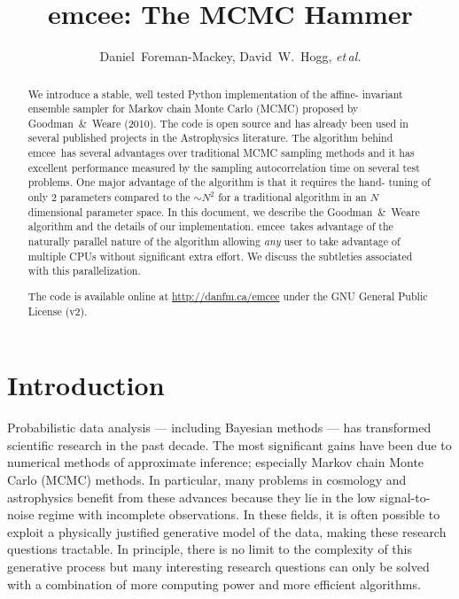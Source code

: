 \documentclass[12pt,preprint]{aastex}
\newcommand{\project}[1]{{\sffamily #1}}
\newcommand{\thisplain}{emcee}
\newcommand{\this}{\project{\thisplain}}
\newcommand{\paper}{document}
\newcommand{\license}{GNU General Public License (v2)}
\newcommand{\foreign}[1]{\emph{#1}}
\newcommand{\etal}{\foreign{et\,al.}}
\begin{document}
\title{\this: The MCMC Hammer}
\author{Daniel~Foreman-Mackey, David~W.~Hogg, \etal}

\begin{abstract}

    We introduce a stable, well tested Python implementation of the affine-%
    invariant ensemble sampler for Markov chain Monte Carlo (MCMC)
    proposed by Goodman~\&~Weare (2010). The code is open source and has
    already been used in several published projects in the Astrophysics
    literature. The algorithm behind \this~has several advantages over
    traditional MCMC sampling methods and it has excellent performance
    measured by the sampling autocorrelation time on several test problems.
    One major advantage of the algorithm is that it requires the hand-%
    tuning of only 2 parameters compared to the $\sim N^2$ for
    a traditional algorithm in an $N$ dimensional parameter space. In this
    \paper, we describe the Goodman~\&~Weare algorithm and the details of our
    implementation. \this~takes advantage of the naturally parallel nature of
    the algorithm allowing \emph{any} user to take advantage of multiple CPUs
    without significant extra effort. We discuss the subtleties associated
    with this parallelization.

    The code is available online at \url{http://danfm.ca/\thisplain} under the
    \license.

\end{abstract}


\section{Introduction}

Probabilistic data analysis --- including Bayesian methods --- has
transformed scientific research in the past decade. The most significant
gains have been due to numerical methods of approximate inference;
especially Markov chain Monte Carlo (MCMC) methods. In particular, many
problems in cosmology and astrophysics benefit from these advances because
they lie in the low signal-to-noise regime with incomplete
observations. In these fields, it is often possible to exploit a physically
justified generative model of the data, making these research questions
tractable. In principle, there is no limit to the complexity of this
generative process but many interesting research questions can only be solved
with a combination of more computing power and more efficient algorithms.
\end{document}
